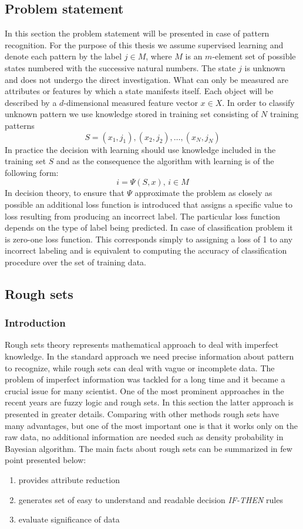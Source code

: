 \subsection{Problem statement}
\label{cha:Problem_statement}
In this section the problem statement will be presented in case of pattern
recognition. For the purpose of this thesis we assume supervised learning and
denote each pattern by the label $j \in M$, where $M$ is an $m$-element set of
possible states numbered with the successive natural numbers. The state $j$ is
unknown and does not undergo the direct investigation. What can only be
measured are attributes or features by which a state manifests itself. Each
object will be described by a $d$-dimensional measured feature vector $x \in
X$. In order to classify unknown pattern we use knowledge stored in training
set consisting of $N$ training patterns
$$S = (x_1, j_1), (x_2, j_2), \ldots, (x_N, j_N)$$
In practice the decision with learning should use knowledge included in the
training set $S$ and as the consequence the algorithm with learning is of the
following form:
$$i=\Psi(S, x), \, i \in M$$
In decision theory, to ensure that $\Psi$ approximate the problem as closely
as possible an additional loss function is introduced that assigns a specific
value to loss resulting from producing an incorrect label. The particular loss
function depends on the type of label being predicted. In case of
classification problem it is zero-one loss function. This corresponds simply to
assigning a loss of 1 to any incorrect labeling and is equivalent to computing
the accuracy of classification procedure over the set of training data.

\subsection{Rough sets}
\label{cha:Rough_set}
\subsubsection{Introduction}
\label{cha:Rough_set_introduction}
Rough sets theory represents mathematical approach to deal with imperfect knowledge. 
In the standard approach we need precise information about pattern to recognize, 
while rough sets can deal with vague or incomplete data. The problem of imperfect 
information was tackled for a long time and it became a crucial issue for many scientist.
One of the most prominent approaches in the recent years are fuzzy logic and rough sets.
In this section the latter approach is presented in greater details. Comparing with 
other methods rough sets have many advantages, but one of the most important
one is that it works only on the raw data, no additional information are needed such 
as density probability in Bayesian algorithm. The main facts about rough sets can be 
summarized in few point presented below:
\begin{enumerate}
    \item provides attribute reduction
    \item generates set of easy to understand and readable decision
        \textit{IF-THEN} rules
    \item evaluate significance of data 
\end{enumerate}

